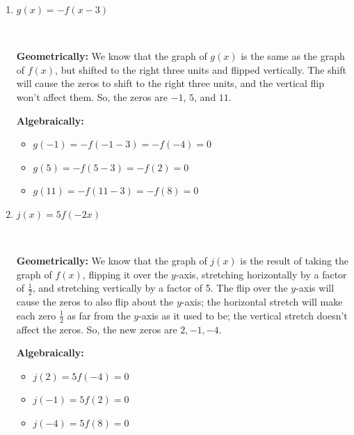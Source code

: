 \documentclass{article}
\begin{document}
\begin{enumerate}
\begin{enumerate}
\begin{itemize}
    \item $Q(4) = f \left(\frac{4}{2} \right) = f(2)$, and we know that $f(2)= 0$ because 2 is a zero of $f$.

    \item $Q(16) = f \left(\frac{16}{2} \right) = f(8) = 0$, and we know that $f(8)= 0$ because 8 is a zero of $f$.
    \end{itemize}
    So, $Q(-8)$, $Q(4)$, and $Q(16)$ are all equal to 0. 

  \item
    \begin{problem}[\vfill]
      $g(x) = -f(x-3)$
    \end{problem}

    \begin{solution}\

      \textbf{Geometrically:} We know that the graph of $g(x)$ is the same as the graph of $f(x)$, but shifted to the right three units and flipped vertically. The shift will cause the zeros to shift to the right three units, and the vertical flip won't affect them. So, the zeros are $-1$, $5$, and $11$.

      \textbf{Algebraically:} 
      \begin{itemize}
      \item $g (-1 ) =  -f(-1-3) =-f(-4)=0$
      \item $g (5 ) = -f(5-3) = -f(2) =0$
      \item $g (11 ) = -f(11-3) =-f(8) =0$
      \end{itemize} 
    \end{solution} 

  \item
    \begin{problem}[\vfill\newpage]
      $j(x) = 5 f(-2x)$
    \end{problem}

    \begin{solution}\

      \textbf{Geometrically:} We know that the graph of $j(x)$ is the result of taking the graph of $f(x)$, flipping it over the $y$-axis, stretching horizontally by a factor of $\frac{1}{2}$, and stretching vertically by a factor of 5. The flip over the $y$-axis will cause the zeros to also flip about the $y$-axis; the horizontal stretch will make each zero $\frac{1}{2}$ as far from the $y$-axis as it used to be; the vertical stretch doesn't affect the zeros. So, the new zeros are $2, -1, -4$.

      \textbf{Algebraically:} 
      \begin{itemize} 
      \item $j(2 ) = 5f(- 4) =0$
      \item $j (-1) =5f(2)=0$
      \item $j (-4 ) = 5f(8) =0$
      \end{itemize}      
    \end{solution} 
  \end{enumerate}


\end{enumerate}
\end{document}
